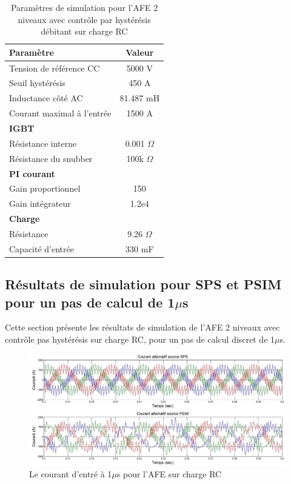 \begin{table}[htb]
\centering
\begin{tabular}{|l|c|} 
  \hline
  \textbf{Paramètre} & \textbf{Valeur}  \\
  \hline\hline
  Tension de référence CC & 5000 V\\ \hline
  Seuil hystérésis & 450 A\\ \hline
  Inductance côté AC& 81.487 mH\\ \hline
  Courant maximal à l'entrée& 1500 A \\ \hline \hline
  \multicolumn{2}{|l|}{\textbf{IGBT}}\\ \hline
  Résistance interne & 0.001 $\Omega$\\
  Résistance du snubber & 100k $\Omega$\\ \hline \hline
   \multicolumn{2}{|l|}{\textbf{PI courant}}\\ \hline
  Gain proportionnel & 150 \\
  Gain intégrateur & 1.2e4 \\ \hline \hline
  \multicolumn{2}{|l|}{\textbf{Charge}}\\ \hline
  Résistance & 9.26 $\Omega$ \\
  Capacité d'entrée & 330 mF\\
  \hline
\end{tabular}
\caption{Paramètres de simulation pour l'AFE 2 niveaux avec contrôle par hystérésis débitant sur charge RC}
\label{p_AF_RC}
\end{table}

\clearpage

\subsection{Résultats de simulation pour SPS et PSIM pour un pas de calcul de 1$\mu$s}
Cette section présente les résultats de simulation de l'AFE 2 niveaux avec contrôle pas hystérésis sur charge RC, pour un pas de calcul discret de 1$\mu$s. 




\begin{figure}[htb]
\centering
\includegraphics[scale=0.5]{fig/AFERC/cour_al.jpg}
\caption{Le courant d'entré à 1$\mu$s pour l'AFE sur charge RC}
\label{AF_RC_cou}
\end{figure}




